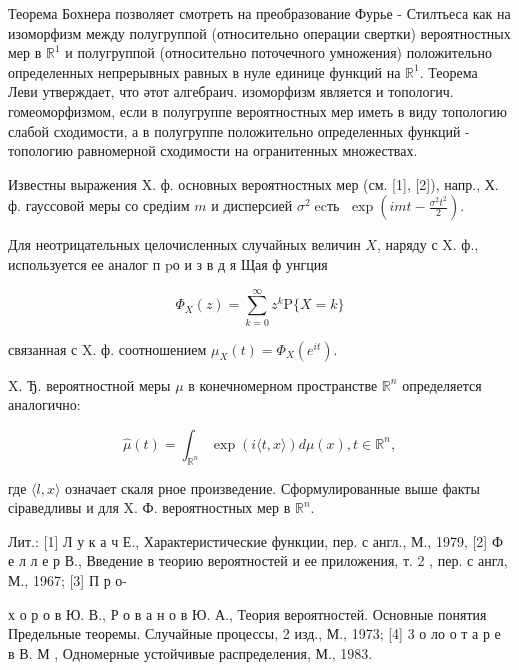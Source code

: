 \documentclass[10pt]{article}
\begin{document}
Теорема Бохнера позволяет смотреть на преобразование Фурье - Стилтьеса как на изоморфизм между полугруппой (относительно операции свертки) вероятностных мер в $\mathbb{R}^{1}$ и полугруппой (относительно поточечного умножения) положительно определенных непрерывных равных в нуле единице функций на $\mathbb{R}^{1}$. Теорема Леви утверждает, что әтот алгебраич. изоморфизм является и топологич. гомеоморфизмом, если в полугруппе вероятностных мер иметь в виду топологию слабой сходимости, а в полугруппе положительно определенных функций - топологию равномерной сходимости на огранитенных множествах.



Известны выражения X. ф. основных вероятностных мер (см. [1], [2]), напр., Х. ф. гауссовой меры со средіим $m$ и дисперсией $\sigma^{2} \operatorname{ecть~} \exp \left(i m t-\frac{\sigma^{2} t^{2}}{2}\right)$.



Для неотрицательных целочисленных случайных величин $X$, наряду с X. ф., используется ее аналог п $\mathrm{p} о$ и з в д я Щая ф унгция



\[

\Phi_{X}(z)=\sum_{k=0}^{\infty} z^{k} \mathrm{P}\{X=k\}

\]



связанная с $\mathrm{X}$. ф. соотношением $\mu_{X}(t)=\Phi_{X}\left(e^{i t}\right)$.



X. Ђ. вероятностной меры $\mu$ в конечномерном пространстве $\mathbb{R}^{n}$ определяется аналогично:



\[

\hat{\mu}(t)=\int_{\mathbb{R}^{n}} \exp (i\langle t, x\rangle) d \mu(x), t \in \mathbb{R}^{n},

\]



где $\langle l, x\rangle$ означает скаля рное произведение. Сформулированные выше факты сіраведливы и для X. Ф. вероятностных мер в $\mathbb{R}^{n}$.



Лит.: [1] Л у к а ч Е., Характеристические функции, пер. с англ., М., 1979, [2] Ф е л л е р В., Введение в теорию вероятностей и ее приложения, т. 2 , пер. с англ, М., 1967; [3] П р о-

х о р о в Ю. В., Р о в а н о в Ю. А., Теория вероятностей. Основные понятия Предельные теоремы. Случайные процессы, 2 изд., М., 1973; [4] 3 о ло о т а р е в В. М , Одномерные устойчивые распределения, М., 1983.
\end{document}
